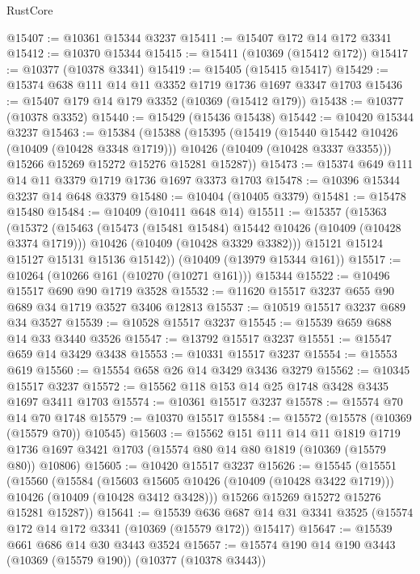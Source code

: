 \begin{lexlean}{RustCore}
\begin{coremodule}
@15407 := @10361 @15344 @3237
@15411 := @15407 @172 @14 @172 @3341
@15412 := @10370 @15344
@15415 := @15411 (@10369 (@15412 @172))
@15417 := @10377 (@10378 @3341)
@15419 := @15405 (@15415 @15417)
@15429 := @15374 @638 @111 @14 @11 @3352 @1719 @1736 @1697 @3347 @1703
@15436 := @15407 @179 @14 @179 @3352 (@10369 (@15412 @179))
@15438 := @10377 (@10378 @3352)
@15440 := @15429 (@15436 @15438)
@15442 := @10420 @15344 @3237
@15463 := @15384
    (@15388
      (@15395
        (@15419
          (@15440 @15442 @10426 (@10409 (@10428 @3348 @1719)))
          @10426
          (@10409 (@10428 @3337 @3355)))
        @15266
        @15269
        @15272
        @15276
        @15281
        @15287))
@15473 := @15374 @649 @111 @14 @11 @3379 @1719 @1736 @1697 @3373 @1703
@15478 := @10396 @15344 @3237 @14 @648 @3379
@15480 := @10404 (@10405 @3379)
@15481 := @15478 @15480
@15484 := @10409 (@10411 @648 @14)
@15511 := @15357
    (@15363
      (@15372
        (@15463
          (@15473 (@15481 @15484) @15442 @10426 (@10409 (@10428 @3374 @1719)))
          @10426
          (@10409 (@10428 @3329 @3382)))
        @15121
        @15124
        @15127
        @15131
        @15136
        @15142))
    (@10409 (@13979 @15344 @161))
@15517 := @10264 (@10266 @161 (@10270 (@10271 @161))) @15344
@15522 := @10496 @15517 @690 @90 @1719 @3528
@15532 := @11620 @15517 @3237 @655 @90 @689 @34 @1719 @3527 @3406 @12813
@15537 := @10519 @15517 @3237 @689 @34 @3527
@15539 := @10528 @15517 @3237
@15545 := @15539 @659 @688 @14 @33 @3440 @3526
@15547 := @13792 @15517 @3237
@15551 := @15547 @659 @14 @3429 @3438
@15553 := @10331 @15517 @3237
@15554 := @15553 @619
@15560 := @15554 @658 @26 @14 @3429 @3436 @3279
@15562 := @10345 @15517 @3237
@15572 := @15562 @118 @153 @14 @25 @1748 @3428 @3435 @1697 @3411 @1703
@15574 := @10361 @15517 @3237
@15578 := @15574 @70 @14 @70 @1748
@15579 := @10370 @15517
@15584 := @15572 (@15578 (@10369 (@15579 @70)) @10545)
@15603 := @15562
    @151
    @111
    @14
    @11
    @1819
    @1719
    @1736
    @1697
    @3421
    @1703
    (@15574 @80 @14 @80 @1819 (@10369 (@15579 @80)) @10806)
@15605 := @10420 @15517 @3237
@15626 := @15545
    (@15551
      (@15560
        (@15584
          (@15603 @15605 @10426 (@10409 (@10428 @3422 @1719)))
          @10426
          (@10409 (@10428 @3412 @3428)))
        @15266
        @15269
        @15272
        @15276
        @15281
        @15287))
@15641 := @15539
    @636
    @687
    @14
    @31
    @3341
    @3525
    (@15574 @172 @14 @172 @3341 (@10369 (@15579 @172)) @15417)
@15647 := @15539 @661 @686 @14 @30 @3443 @3524
@15657 := @15574 @190 @14 @190 @3443 (@10369 (@15579 @190)) (@10377 (@10378 @3443))

\end{coremodule}
\end{lexlean}
